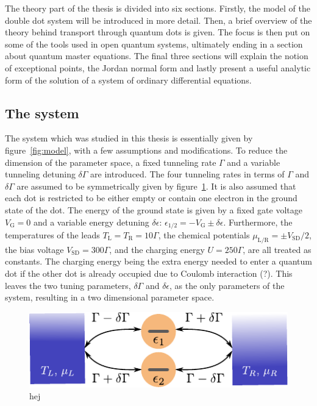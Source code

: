 \documentclass[../main.tex]{subfiles}
\begin{document}
The theory part of the thesis is divided into six sections. Firstly, the model of the double dot system will be introduced in more detail. Then, a brief overview of the theory behind transport through quantum dots is given. The focus is then put on some of the tools used in open quantum systems, ultimately ending in a section about quantum master equations. The final three sections will explain the notion of exceptional points, the Jordan normal form and lastly present a useful analytic form of the solution of a system of ordinary differential equations.
\subsection{The system}\label{sec:sys}
The system which was studied in this thesis is essentially given by figure~\ref{fig:model}, with a few assumptions and modifications. To reduce the dimension of the parameter space, a fixed tunneling rate $\Gamma$ and a variable tunneling detuning $\delta\Gamma$ are introduced. The four tunneling rates in terms of $\Gamma$ and $\delta\Gamma$ are assumed to be symmetrically given by figure~\ref{fig:model2}. It is also assumed that each dot is restricted to be either empty or contain one electron in the ground state of the dot. The energy of the ground state is given by a fixed gate voltage $V_\text{G}=0$ and a variable energy detuning $\delta\epsilon$: $\epsilon_{1/2} = -V_\text{G} \pm \delta\epsilon$. Furthermore, the temperatures of the leads $T_\text{L}=T_\text{R}=10\Gamma$, the chemical potentials $\mu_\text{L/R} = \pm V_\text{SD}/2$, the bias voltage $V_\text{SD} = 300\Gamma$, and the charging energy $U = 250\Gamma$, are all treated as constants. The charging energy being the extra energy needed to enter a quantum dot if the other dot is already occupied due to Coulomb interaction (?). This leaves the two tuning parameters, $\delta\Gamma$ and $\delta\epsilon$, as the only parameters of the system, resulting in a two dimensional parameter space. 

\begin{figure}[H]
    \centering
    \includegraphics[width=0.8\linewidth]{figures/model.pdf}
    \caption{hej}
    \label{fig:model2}
\end{figure}
\end{document}
